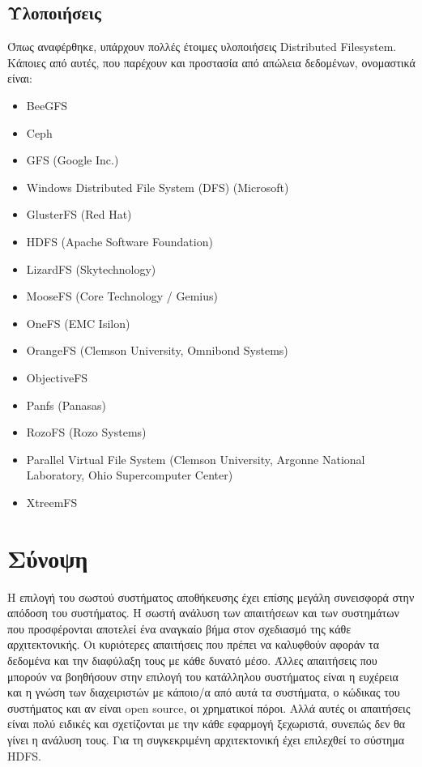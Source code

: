 \subsection{Υλοποιήσεις}
Όπως αναφέρθηκε, υπάρχουν πολλές έτοιμες υλοποιήσεις Distributed Filesystem.
Κάποιες από αυτές, που παρέχουν και προστασία από απώλεια δεδομένων, ονομαστικά είναι:
\begin{itemize}
\item BeeGFS
\item Ceph
\item GFS (Google Inc.)
\item Windows Distributed File System (DFS) (Microsoft)
\item GlusterFS (Red Hat)
\item HDFS (Apache Software Foundation)
\item LizardFS (Skytechnology)
\item MooseFS (Core Technology / Gemius)
\item OneFS (EMC Isilon)
\item OrangeFS (Clemson University, Omnibond Systems)
\item ObjectiveFS
\item Panfs (Panasas)
\item RozoFS (Rozo Systems)
\item Parallel Virtual File System (Clemson University, Argonne National Laboratory, Ohio Supercomputer Center)
\item XtreemFS
\end{itemize}


\section{Σύνοψη}
Η επιλογή του σωστού συστήματος αποθήκευσης έχει επίσης μεγάλη συνεισφορά στην απόδοση του συστήματος. Η σωστή ανάλυση των απαιτήσεων και των συστημάτων που προσφέρονται αποτελεί ένα αναγκαίο βήμα στον σχεδιασμό της κάθε αρχιτεκτονικής. Οι κυριότερες απαιτήσεις που πρέπει να καλυφθούν αφοράν τα δεδομένα και την διαφύλαξη τους με κάθε δυνατό μέσο.
Άλλες απαιτήσεις που μπορούν να βοηθήσουν στην επιλογή του κατάλληλου συστήματος είναι η ευχέρεια και η γνώση των διαχειριστών με κάποιο/α από αυτά τα συστήματα, ο κώδικας του συστήματος και αν είναι open source, οι χρηματικοί πόροι. Αλλά αυτές οι απαιτήσεις είναι πολύ ειδικές και σχετίζονται με την κάθε εφαρμογή ξεχωριστά, συνεπώς δεν θα γίνει η ανάλυση τους.
\newline
Για τη συγκεκριμένη αρχιτεκτονική έχει επιλεχθεί το σύστημα HDFS.